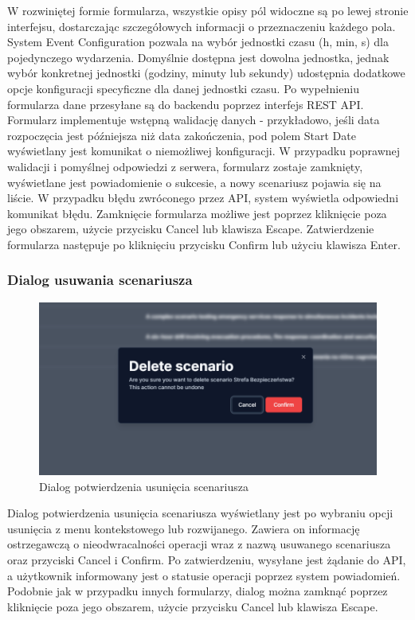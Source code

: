 W rozwiniętej formie formularza, wszystkie opisy pól widoczne są po lewej stronie interfejsu, dostarczając szczegółowych informacji o przeznaczeniu każdego pola.
System Event Configuration pozwala na wybór jednostki czasu (h, min, s) dla pojedynczego wydarzenia. Domyślnie dostępna jest dowolna jednostka, jednak wybór konkretnej jednostki (godziny, minuty lub sekundy) udostępnia dodatkowe opcje konfiguracji specyficzne dla danej jednostki czasu.
Po wypełnieniu formularza dane przesyłane są do backendu poprzez interfejs REST API. Formularz implementuje wstępną walidację danych - przykładowo, jeśli data rozpoczęcia jest późniejsza niż data zakończenia, pod polem Start Date wyświetlany jest komunikat o niemożliwej konfiguracji. W przypadku poprawnej walidacji i pomyślnej odpowiedzi z serwera, formularz zostaje zamknięty, wyświetlane jest powiadomienie o sukcesie, a nowy scenariusz pojawia się na liście. W przypadku błędu zwróconego przez API, system wyświetla odpowiedni komunikat błędu.
Zamknięcie formularza możliwe jest poprzez kliknięcie poza jego obszarem, użycie przycisku Cancel lub klawisza Escape. Zatwierdzenie formularza następuje po kliknięciu przycisku Confirm lub użyciu klawisza Enter.

\subsubsection{Dialog usuwania scenariusza}
\begin{figure}[h]
    \centering
    \includegraphics[width=\textwidth]{resources/local/04-implementacja/frontend/landing/delete-scenario-form}
    \caption{Dialog potwierdzenia usunięcia scenariusza}
    \label{fig:delete_scenario}
\end{figure}
Dialog potwierdzenia usunięcia scenariusza wyświetlany jest po wybraniu opcji usunięcia z menu kontekstowego lub rozwijanego. Zawiera on informację ostrzegawczą o nieodwracalności operacji wraz z nazwą usuwanego scenariusza oraz przyciski Cancel i Confirm.
Po zatwierdzeniu, wysyłane jest żądanie do API, a użytkownik informowany jest o statusie operacji poprzez system powiadomień. Podobnie jak w przypadku innych formularzy, dialog można zamknąć poprzez kliknięcie poza jego obszarem, użycie przycisku Cancel lub klawisza Escape.
